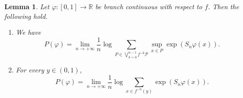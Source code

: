 \documentclass[12pt]{amsart}
\numberwithin{equation}{section} %
\numberwithin{figure}{section} %
\theoremstyle{plain}
\newtheorem{lemm}[prop]{Lemma}
\theoremstyle{definition}
\theoremstyle{remark}
\theoremstyle{citing}
\newcommand{\R}{\mathbb{R}}
\renewcommand{\=}{\coloneqq}
\begin{document}
\begin{lemm}\label{tree pressure}
    Let $\varphi:[0,1]\to\R$ be branch continuous with respect to $f$. Then the following hold.
    \begin{enumerate}
    \item[1.] We have
    \begin{equation}\label{eq lemma tree pressure part 1}
        P(\varphi) = \lim_{n\to +\infty}\frac{1}{n} \log \sum_{P\in \bigvee_{k=0}^{n-1}f^{-k} \mathcal{P}} \sup_{x\in P}\exp(S_n\varphi(x)).
    \end{equation}
    \item[2.] For every $y\in(0,1)$,
    \begin{equation}\label{eq lemma tree pressure part 2}
        P(\varphi) = \lim_{n\to+\infty} \frac{1}{n} \log \sum_{x\in f^{-n}(y)} \exp(S_n \varphi(x)).
    \end{equation}
    \end{enumerate}
\end{lemm}
\end{document}
